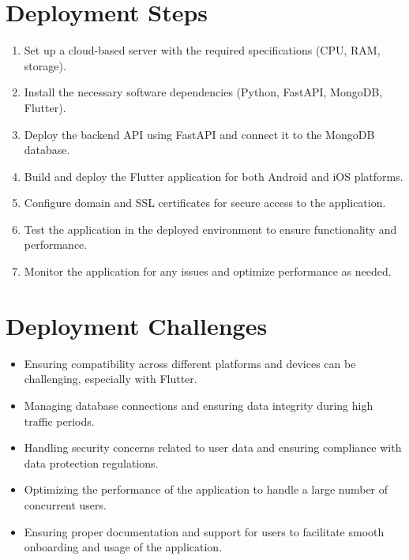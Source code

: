 \documentclass[openany]{report}
\begin{document}
\section{Deployment Steps}
\begin{enumerate}
    \item Set up a cloud-based server with the required specifications (CPU, RAM, storage).
    \item Install the necessary software dependencies (Python, FastAPI, MongoDB, Flutter).
    \item Deploy the backend API using FastAPI and connect it to the MongoDB database.
    \item Build and deploy the Flutter application for both Android and iOS platforms.
    \item Configure domain and SSL certificates for secure access to the application.
    \item Test the application in the deployed environment to ensure functionality and performance.
    
    \item Monitor the application for any issues and optimize performance as needed.
\end{enumerate}

\section{Deployment Challenges}
\begin{itemize}
    \item Ensuring compatibility across different platforms and devices can be challenging, especially with Flutter.
    \item Managing database connections and ensuring data integrity during high traffic periods.
    \item Handling security concerns related to user data and ensuring compliance with data protection regulations.
    \item Optimizing the performance of the application to handle a large number of concurrent users.
    \item Ensuring proper documentation and support for users to facilitate smooth onboarding and usage of the application.
    
\end{itemize}
\end{document}
